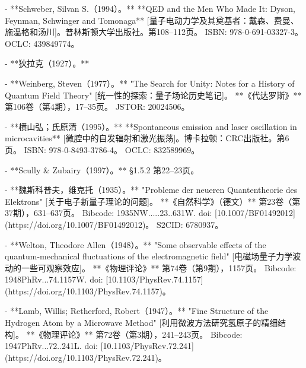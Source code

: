 \begin{enumerate}
- **Schweber, Silvan S.（1994）。**  
  **QED and the Men Who Made It: Dyson, Feynman, Schwinger and Tomonaga** [量子电动力学及其奠基者：戴森、费曼、施温格和汤川]。普林斯顿大学出版社。第108–112页。  
  ISBN: 978-0-691-03327-3。  
  OCLC: 439849774。  

- **狄拉克（1927）。**  

- **Weinberg, Steven（1977）。**  
  "The Search for Unity: Notes for a History of Quantum Field Theory" [统一性的探索：量子场论历史笔记]。  
  **《代达罗斯》** 第106卷（第4期），17–35页。  
  JSTOR: 20024506。  

- **横山弘；氏原清（1995）。**  
  **Spontaneous emission and laser oscillation in microcavities** [微腔中的自发辐射和激光振荡]。博卡拉顿：CRC出版社。第6页。  
  ISBN: 978-0-8493-3786-4。  
  OCLC: 832589969。  

- **Scully & Zubairy（1997）。**  
  §1.5.2 第22–23页。  

- **魏斯科普夫，维克托（1935）。**  
  "Probleme der neueren Quantentheorie des Elektrons" [关于电子新量子理论的问题]。  
  **《自然科学》（德文）** 第23卷（第37期），631–637页。  
  Bibcode: 1935NW.....23..631W.  
  doi: [10.1007/BF01492012](https://doi.org/10.1007/BF01492012)。  
  S2CID: 6780937。  

- **Welton, Theodore Allen（1948）。**  
  "Some observable effects of the quantum-mechanical fluctuations of the electromagnetic field" [电磁场量子力学波动的一些可观察效应]。  
  **《物理评论》** 第74卷（第9期），1157页。  
  Bibcode: 1948PhRv...74.1157W.  
  doi: [10.1103/PhysRev.74.1157](https://doi.org/10.1103/PhysRev.74.1157)。  

- **Lamb, Willis; Retherford, Robert（1947）。**  
  "Fine Structure of the Hydrogen Atom by a Microwave Method" [利用微波方法研究氢原子的精细结构]。  
  **《物理评论》** 第72卷（第3期），241–243页。  
  Bibcode: 1947PhRv...72..241L.  
  doi: [10.1103/PhysRev.72.241](https://doi.org/10.1103/PhysRev.72.241)。  
\end{enumerate}  